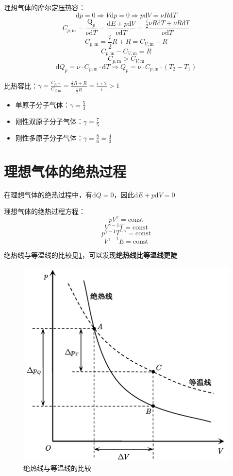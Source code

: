 \documentclass[12pt, a4paper, twoside]{ctexbook}
\begin{document}
{\sonti 理想气体的摩尔定压热容}：
$$
\mathrm{d}p=0 \Rightarrow V\mathrm{d}p=0 \Rightarrow p\mathrm{d}V=\nu R\mathrm{d}T
$$
$$
C_{p,\mathrm{m}}=\frac{\mathrm{Q}_p}{\nu \mathrm{d}T}=\frac{\mathrm{d}E+p\mathrm{d}V}{\nu \mathrm{d}T}=\frac{\frac{i}{2} \nu R\mathrm{d}T+\nu R\mathrm{d}T}{\nu \mathrm{d}T}
$$
$$
C_{p,\mathrm{m}}=\frac{i}{2}R+R=C_{V,\mathrm{m}}+R
$$
$$
C_{p,\mathrm{m}}-C_{V,\mathrm{m}}=R
$$
$$
C_{p,\mathrm{m}}>C_{V,\mathrm{m}}
$$
$$
\mathrm{d}Q_p=\nu\cdot C_{p,\mathrm{m}} \cdot \mathrm{d}T \Rightarrow Q_p=\nu\cdot C_{p,\mathrm{m}}\cdot\left(T_2-T_1\right)
$$

{\sonti 比热容比}：$\gamma =\frac{C_{p,\mathrm{m}}}{C_{V,\mathrm{m}}}=\frac{\frac{i}{2}R+R}{\frac{i}{2}R}=\frac{i+2}{i}>1$
\begin{itemize}
    \item {\sonti 单原子分子气体}：$\gamma = \frac{5}{3}$
    \item {\sonti 刚性双原子分子气体}：$\gamma = \frac{7}{5}$
    \item {\sonti 刚性多原子分子气体}：$\gamma = \frac{8}{6}=\frac{4}{3}$
\end{itemize}
\section{理想气体的绝热过程}
在理想气体的绝热过程中，有$\mathrm{d}Q=0$，因此$\mathrm{d}E+p\mathrm{d}V=0$

{\sonti 理想气体的绝热过程方程}：
$$
pV^\gamma=\mathrm{const}
$$
$$
V^{\gamma-1}T=\mathrm{const}
$$
$$
p^{\gamma-1}T^{-\gamma}=\mathrm{const}
$$
$$
V^{\gamma-1}E=\mathrm{const}
$$

绝热线与等温线的比较见\textcolor{blue}{\cref{fig:绝热线与等温线的比较}}，可以发现\textbf{绝热线比等温线更陡}
\begin{figure}[H]
    \centerline{\includegraphics[scale=1.2]{绝热线与等温线的比较.pdf}}
    \caption{绝热线与等温线的比较}\label{fig:绝热线与等温线的比较}
\end{figure}
\end{document}
